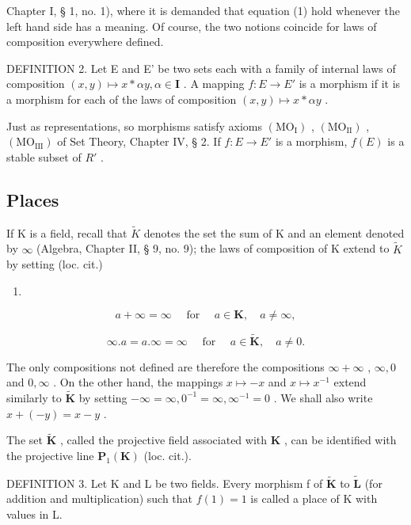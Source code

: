 Chapter I, § 1, no. 1), where it is demanded that equation (1) hold whenever the left hand side has a meaning. Of course, the two notions coincide for laws of composition everywhere defined.

DEFINITION 2. Let E and E' be two sets each with a family of internal laws of composition \((x,y)\mapsto x*\alpha y,\alpha\in\mathbf{I}\) . A mapping \(f:E\to E'\) is a morphism if it is a morphism for each of the laws of composition \((x,y)\mapsto x*\alpha y\) .

Just as representations, so morphisms satisfy axioms \((\mathrm{MO}_{\mathrm{I}})\) , \((\mathrm{MO}_{\mathrm{II}})\) , \((\mathrm{MO}_{\mathrm{III}})\) of Set Theory, Chapter IV, § 2. If \(f: E \to E'\) is a morphism, \(f(E)\) is a stable subset of \(R'\) .

\subsection{Places}

If K is a field, recall that \(\tilde{K}\) denotes the set the sum of K and an element denoted by \(\infty\) (Algebra, Chapter II, § 9, no. 9); the laws of composition of K extend to \(\tilde{K}\) by setting (loc. cit.)

\begin{enumerate}
\def\labelenumi{(\arabic{enumi})}
\setcounter{enumi}{1}
\tightlist
\item
\end{enumerate}

\[
a + \infty = \infty \quad \text { for } \quad a \in \mathbf {K}, \quad a \neq \infty ,\tag{2}
\]

\[
\infty . a = a. \infty = \infty \quad \text {   for   } \quad a \in \tilde {\mathbf {K}}, \quad a \neq 0.\tag{3}
\]

The only compositions not defined are therefore the compositions \(\infty + \infty\) , \(\infty, 0\) and \(0, \infty\) . On the other hand, the mappings \(x \mapsto -x\) and \(x \mapsto x^{-1}\) extend similarly to \(\tilde{\mathbf{K}}\) by setting \(-\infty = \infty, 0^{-1} = \infty, \infty^{-1} = 0\) . We shall also write \(x + (-y) = x - y\) .

The set \(\tilde{\mathbf{K}}\) , called the projective field associated with \(\mathbf{K}\) , can be identified with the projective line \(\mathbf{P}_1(\mathbf{K})\) (loc. cit.).

DEFINITION 3. Let K and L be two fields. Every morphism f of \(\tilde{\mathbf{K}}\) to \(\tilde{\mathbf{L}}\) (for addition and multiplication) such that \(f(1) = 1\) is called a place of K with values in L.

